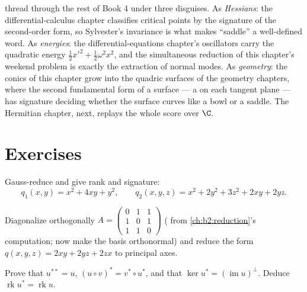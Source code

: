 \begin{remark}
 thread through the rest of Book 4 under three
disguises. As \emph{Hessians}: the differential-calculus
chapter classifies critical points by the signature of the
second-order form, so Sylvester's invariance is what makes
``saddle'' a well-defined word. As \emph{energies}: the
differential-equations chapter's oscillators carry the
quadratic energy $\frac12x'^2 + \frac12\omega^2x^2$, and the
simultaneous reduction of this chapter's weekend problem is
exactly the extraction of normal modes. As \emph{geometry}:
the conics of this chapter grow into the quadric surfaces of
the geometry chapters, where the second fundamental form of a
surface --- a  on each tangent plane --- has
signature deciding whether the surface curves like a bowl or
a saddle. The Hermitian chapter, next, replays the whole score
over $\C$.
\end{remark}

\section{Exercises}

\begin{exercise}[$\star$]\label{exo:b2:quadratic:1}
Gauss-reduce and give rank and signature:
\[
q_1(x,y) = x^2 + 4xy + y^2,
\qquad
q_2(x,y,z) = x^2 + 2y^2 + 3z^2 + 2xy + 2yz .
\]
\end{exercise}

\begin{exercise}[$\star$]\label{exo:b2:quadratic:2}
Diagonalize orthogonally $A = \begin{pmatrix} 0 & 1 & 1\\ 1 & 0 &
1\\ 1 & 1 & 0\end{pmatrix}$ ( from
\cref{ch:b2:reduction}'s computation; now make the basis
orthonormal) and reduce the form $q(x,y,z) = 2xy + 2yz + 2zx$ to
principal axes.
\end{exercise}

\begin{exercise}[$\star$]\label{exo:b2:quadratic:3}
Prove that $u^{**} = u$, $(u \circ v)^* = v^* \circ u^*$, and that
$\ker u^* = (\operatorname{im} u)^{\perp}$. Deduce
$\operatorname{rk} u^* = \operatorname{rk} u$.
\end{exercise}

